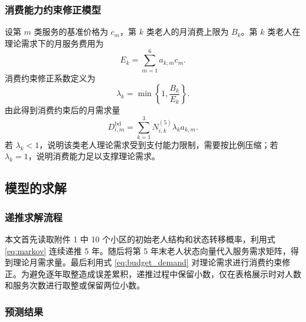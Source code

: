 \subsubsection{消费能力约束修正模型}

设第 $m$ 类服务的基准价格为 $c_m$，第 $k$ 类老人的月消费上限为 $B_k$。第 $k$ 类老人在理论需求下的月服务费用为
\begin{equation}
E_k=\sum_{m=1}^{6}a_{k,m}c_m.
\end{equation}
消费约束修正系数定义为
\begin{equation}
\lambda_k=\min\left\{1,\frac{B_k}{E_k}\right\}.
\end{equation}
由此得到消费约束后的月需求量
\begin{equation}
D_{i,m}^{\mathrm{bd}}=\sum_{k=1}^{3}N_{i,k}^{(5)}\lambda_k a_{k,m}.
\label{eq:budget_demand}
\end{equation}
若 $\lambda_k<1$，说明该类老人理论需求受到支付能力限制，需要按比例压缩；若 $\lambda_k=1$，说明消费能力足以支撑理论需求。

\subsection{模型的求解}

\subsubsection{递推求解流程}

本文首先读取附件 1 中 10 个小区的初始老人结构和状态转移概率，利用式 \eqref{eq:markov} 连续递推 5 年。随后将第 5 年末老人状态向量代入服务需求矩阵，得到理论月需求量。最后利用式 \eqref{eq:budget_demand} 对理论需求进行消费约束修正。为避免逐年取整造成误差累积，递推过程中保留小数，仅在表格展示时对人数和服务次数进行取整或保留两位小数。

\subsubsection{预测结果}

